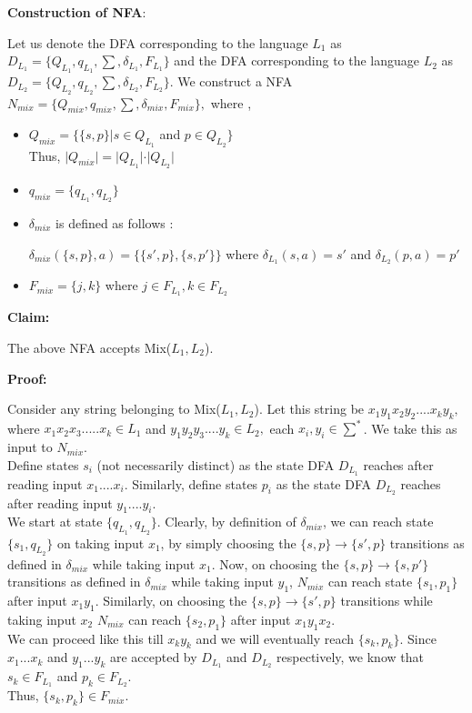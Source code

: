 \documentclass[12pt,a4paper]{article}
\begin{document}
\textbf{Construction of NFA}:

Let us denote the DFA corresponding to the language $L_1$ as $D_{L_1}=\{Q_{L_1},q_{L_1},\sum,\delta_{L_1},F_{L_1}\}$ and the DFA corresponding to the language $L_2$ as $D_{L_2}=\{Q_{L_2},q_{L_2},\sum,\delta_{L_2},F_{L_2}\}$. We construct a NFA $N_{mix}=\{Q_{mix},q_{mix},\sum,\delta_{mix},F_{mix}\},$ where ,


\begin{itemize}
    \item $Q_{mix}=\{\{s,p\} | s \in Q_{L_1} $ and $p \in Q_{L_2} \}$
    \\Thus, $\vert Q_{mix} \vert = \vert Q_{L_1} \vert \cdot \vert Q_{L_2} \vert  $
    \item $q_{mix} = \{q_{L_1},q_{L_2}\}$
    \item $\delta_{mix} $ is defined as follows : 
    
    $\delta_{mix}(\{s,p\},a)=\{\{s',p\},\{s,p'\} \} $ where $\delta_{L_1}(s,a)=s'$ and $\delta_{L_2}(p,a)=p'$ 
    \item $F_{mix}=\{j,k\}$ where $j \in F_{L_1}, k \in F_{L_2}$
    
\end{itemize}


\textbf{Claim:}

The above NFA accepts Mix($L_{1},L_{2}$).

\textbf{Proof:}

Consider any string belonging to Mix($L_{1},L_{2}$). Let this string be $x_1y_1x_2y_2....x_ky_k,$ where $x_1x_2x_3.....x_k \in L_1$ and $y_1y_2y_3....y_k \in L_2,$ each $x_i,y_i \in \sum^*$. We take this as input to $N_{mix}$.
\\Define states $s_{i}$ (not necessarily distinct) as the state DFA $D_{L_1}$ reaches after reading input $x_1....x_i$. Similarly, define states $p_{i}$ as the state DFA $D_{L_2}$ reaches after reading input $y_1....y_i$.
\\We start at state $\{q_{L_1},q_{L_2}\}$. Clearly, by definition of $\delta_{mix}$, we can reach state  $\{s_1,q_{L_2}\}$ on taking input $x_1$, by simply choosing the $\{s,p\} \rightarrow \{s',p\}$ transitions as defined in $\delta_{mix}$ while taking input $x_1$.  Now, on choosing the $\{s,p\} \rightarrow \{s,p'\}$ transitions as defined in $\delta_{mix}$ while taking input $y_1$, $N_{mix}$ can reach state $\{s_1,p_1\}$ after input $x_1y_1$.
Similarly, on choosing the $\{s,p\} \rightarrow \{s',p\}$ transitions while taking input $x_2$ $N_{mix}$ can reach $\{s_2,p_1\}$ after input $x_1y_1x_2$. 
\\We can proceed like this till $x_ky_k$ and we will eventually reach $\{s_k,p_k\}$. 
Since $x_1...x_k$ and $y_1...y_k$ are accepted by $D_{L_1}$ and $D_{L_2}$ respectively, we know that $s_k \in F_{L_1}$ and $p_k \in F_{L_2}$.
\\Thus, $\{s_k,p_k\} \in F_{mix}$.
\end{document}
